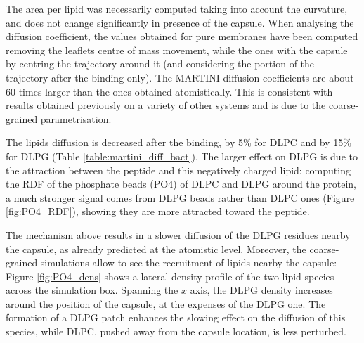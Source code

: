 %
The area per lipid was necessarily computed taking into account the curvature, and does not change significantly in presence of the capsule.
%
When analysing the diffusion coefficient, the values obtained for pure membranes have been computed removing the leaflets centre of mass movement, while the ones with the capsule by centring the trajectory around it (and considering the portion of the trajectory after the binding only). The MARTINI diffusion coefficients are about 60 times larger than the ones obtained atomistically. This is consistent with results obtained previously on a variety of other systems \cite{Venable2017} and is due to the coarse-grained parametrisation.

The lipids diffusion is decreased after the binding, by 5\% for DLPC and by 15\% for DLPG (Table \ref{table:martini_diff_bact}). The larger effect on DLPG is due to the attraction between the peptide and this negatively charged lipid: computing the RDF of the phosphate beads (PO4) of DLPC and DLPG around the protein, a much stronger signal comes from DLPG beads rather than DLPC ones (Figure \ref{fig:PO4_RDF}), showing they are more attracted toward the peptide.

The mechanism above results in a slower diffusion of the DLPG residues nearby the capsule, as already predicted at the atomistic level. Moreover, the coarse-grained simulations allow to see the recruitment of lipids nearby the capsule: Figure \ref{fig:PO4_dens} shows a lateral density profile of the two lipid species across the simulation box. Spanning the $x$ axis, the DLPG density increases around the position of the capsule, at the expenses of the DLPG one. The formation of a DLPG patch enhances the slowing effect on the diffusion of this species, while DLPC, pushed away from the capsule location, is less perturbed.

